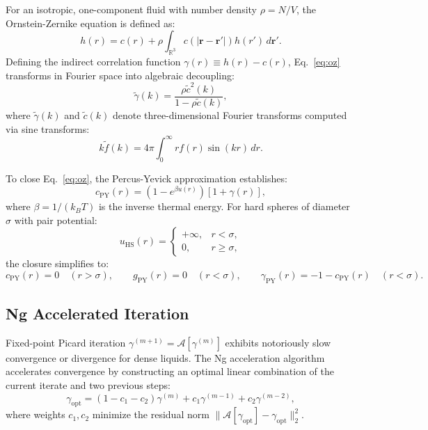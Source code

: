 \documentclass[11pt,a4paper]{article}
\begin{document}
For an isotropic, one-component fluid with number density $\rho = N/V$, the Ornstein-Zernike equation is defined as:
\begin{equation}
    h(r) = c(r) + \rho \int_{\mathbb{R}^3} c(|\mathbf{r} - \mathbf{r}'|) h(r') \, d\mathbf{r}'.
    \label{eq:oz}
\end{equation}
Defining the indirect correlation function $\gamma(r) \equiv h(r) - c(r)$, Eq.~\eqref{eq:oz} transforms in Fourier space into algebraic decoupling:
\begin{equation}
    \tilde{\gamma}(k) = \frac{\rho \tilde{c}^2(k)}{1 - \rho \tilde{c}(k)},
    \label{eq:oz_k}
\end{equation}
where $\tilde{\gamma}(k)$ and $\tilde{c}(k)$ denote three-dimensional Fourier transforms computed via sine transforms:
\begin{equation}
    k \tilde{f}(k) = 4\pi \int_0^\infty r f(r) \sin(kr) \, dr.
\end{equation}

To close Eq.~\eqref{eq:oz}, the Percus-Yevick approximation establishes:
\begin{equation}
    c_{\text{PY}}(r) = \left( 1 - e^{\beta u(r)} \right) \left[ 1 + \gamma(r) \right],
    \label{eq:py_closure}
\end{equation}
where $\beta = 1 / (k_B T)$ is the inverse thermal energy. For hard spheres of diameter $\sigma$ with pair potential:
\begin{equation}
    u_{\text{HS}}(r) = 
    \begin{cases}
        +\infty, & r < \sigma, \\
        0, & r \ge \sigma,
    \end{cases}
\end{equation}
the closure simplifies to:
\begin{equation}
    c_{\text{PY}}(r) = 0 \quad (r > \sigma), \qquad g_{\text{PY}}(r) = 0 \quad (r < \sigma), \qquad \gamma_{\text{PY}}(r) = -1 - c_{\text{PY}}(r) \quad (r < \sigma).
\end{equation}

\subsection{Ng Accelerated Iteration}

Fixed-point Picard iteration $\gamma^{(m+1)} = \mathcal{A}[\gamma^{(m)}]$ exhibits notoriously slow convergence or divergence for dense liquids. The Ng acceleration algorithm \cite{ng1974hypernetted} accelerates convergence by constructing an optimal linear combination of the current iterate and two previous steps:
\begin{equation}
    \gamma_{\text{opt}} = (1 - c_1 - c_2) \gamma^{(m)} + c_1 \gamma^{(m-1)} + c_2 \gamma^{(m-2)},
\end{equation}
where weights $c_1, c_2$ minimize the residual norm $\| \mathcal{A}[\gamma_{\text{opt}}] - \gamma_{\text{opt}} \|_2^2$.
\end{document}
